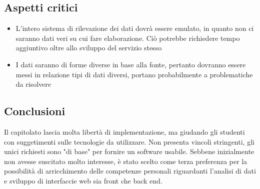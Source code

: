 \subsection{Aspetti critici}
\begin{itemize}
    \item L'intero sistema di rilevazione dei dati dovrà essere emulato, in quanto non ci saranno dati veri su cui fare elaborazione. Ciò potrebbe richiedere tempo aggiuntivo oltre allo sviluppo del servizio stesso
    \item I dati saranno di forme diverse in base alla fonte, pertanto dovranno essere messi in relazione tipi di dati diversi, portano probabilmente a problematiche da risolvere
\end{itemize}
\subsection{Conclusioni}
Il capitolato lascia molta libertà di implementazione, ma giudando gli studenti con suggetimenti sulle tecnologie da utilizzare.
Non presenta vincoli stringenti, gli unici richiesti sono "di base" per fornire un software usabile.
Sebbene inizialmente non avesse suscitato molto interesse, è stato scelto come terza preferenza per la possibilità di arricchimento delle competenze personali
riguardanti l'analisi di dati e sviluppo di interfaccie web sia front che back end.
